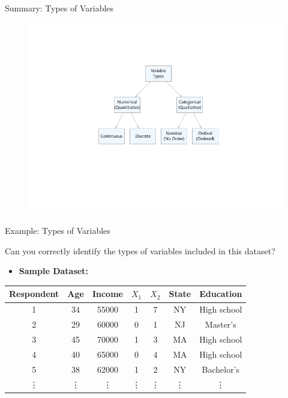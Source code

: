 \documentclass[handout]{beamer} %
\begin{document}
\begin{frame}{Summary: Types of Variables}
    \begin{figure}[h]
    \centering
    \includegraphics[width=1\textwidth, trim=90 95 90 50, clip]{Diagram-Variable-Types.pdf}
    \label{fig:vartypes}
\end{figure}
\end{frame}

\begin{frame}{Example: Types of Variables}

Can you correctly identify the types of variables included in this dataset?
    \begin{itemize}
        \item \textbf{Sample Dataset:}
    \end{itemize}
        \begin{center}
                     \begin{tabular}{|c|c|c|c|c|c|c|}
            \hline
            \textbf{Respondent} & \textbf{Age} & \textbf{Income} & \textbf{$X_1$} & \textbf{$X_2$} & \textbf{State} & \textbf{Education} \\ \hline
            1 & 34 & 55000 & 1 & 7 & NY & High school \\ \hline
            2 & 29 & 60000 & 0 & 1 & NJ & Master’s \\  \hline
            3 & 45 & 70000 & 1 & 3 & MA & High school \\ \hline
            4 & 40 & 65000 & 0 & 4 & MA & High school \\ \hline
            5 & 38 & 62000 & 1 & 2 & NY & Bachelor’s \\  \hline
            \vdots & \vdots  & \vdots  & \vdots  & \vdots  & \vdots & \vdots   \\ \hline
        \end{tabular}
        \end{center}
\end{frame}
\end{document}
